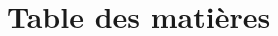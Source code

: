 \section*{Table des matières}
\renewcommand{\contentsname}{Table des matières}
\makeatletter
\renewcommand{\tableofcontents}{%
}
\makeatother
\begin{multicols}{2}
\tableofcontents
\end{multicols}

